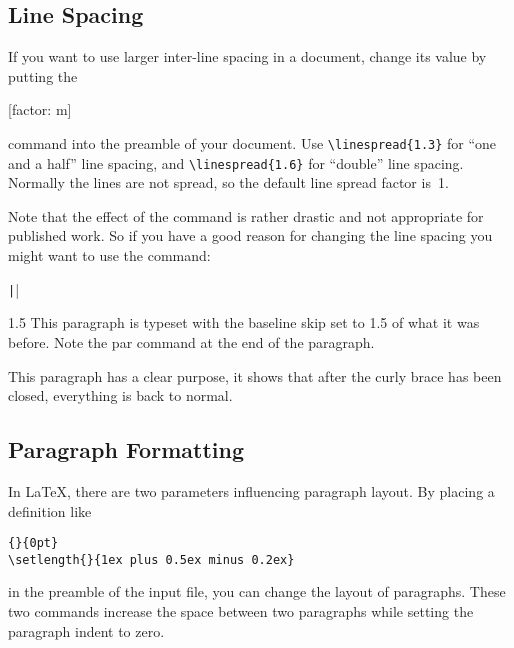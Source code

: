 \subsection{Line Spacing}

If you want to use larger inter-line spacing in a
document, change its value by putting the
\begin{lscommand}
  [factor: m]
\end{lscommand}
command into the preamble of your document.
Use \verb|\linespread{1.3}| for ``one and a half'' line
spacing, and \verb|\linespread{1.6}| for ``double'' line spacing.  Normally
the lines are not spread, so the default line spread factor
is~1.

Note that the effect of the  command is rather drastic and
not appropriate for published work. So if you have a good reason for
changing the line spacing you might want to use the command:
\begin{lscommand}
  \texttt|\setlength{\baselineskip}{1.5\baselineskip}|
\end{lscommand}

\begin{example}
{\setlength{\baselineskip}%
           {1.5\baselineskip}
This paragraph is typeset with
the baseline skip set to 1.5 of
what it was before. Note the
par command at the end of the
paragraph.\par}

This paragraph has a clear
purpose, it shows that after the
curly brace has been closed,
everything is back to normal.
\end{example}

\subsection{Paragraph Formatting}\label{parsp}

In \LaTeX{}, there are two parameters influencing paragraph layout.
By placing a definition like
\begin{code}
\verb|{|\verb|}{0pt}| \\
\verb|\setlength{|\verb|}{1ex plus 0.5ex minus 0.2ex}|
\end{code}
in the preamble of the input file, you can change the layout of
paragraphs. These two commands increase the space between two paragraphs
while setting the paragraph indent to zero.

